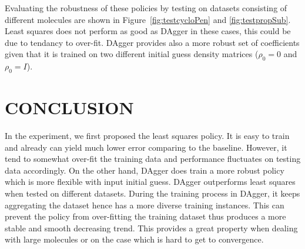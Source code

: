 \documentclass[twoside,11pt]{article}
\begin{document}
Evaluating the robustness of these policies by testing on datasets consisting of different molecules are shown in Figure~\ref{fig:testcycloPen} and \ref{fig:testpropSub}. Least squares does not perform as good as DAgger in these cases, this could be due to tendancy to over-fit. DAgger provides also a more robust set of coefficients given that it is trained on two different initial guess density matrices ($\rho_0 = 0$ and $\rho_0 = I$).



\section{CONCLUSION}
In the experiment, we first proposed the least squares policy. It is easy to train and already can yield much lower error comparing to the baseline. However, it tend to somewhat over-fit the training data and performance fluctuates on testing data accordingly. On the other hand, DAgger does train a more robust policy which is more flexible with input initial guess. DAgger outperforms least squares when tested on different datasets.  
During the training process in DAgger, it keeps aggregating the dataset hence has a more diverse training instances. This can prevent the policy from over-fitting the training dataset thus produces a more stable and smooth decreasing trend. This provides a great property when dealing with large molecules or on the case which is hard to get to convergence.


\end{document}
